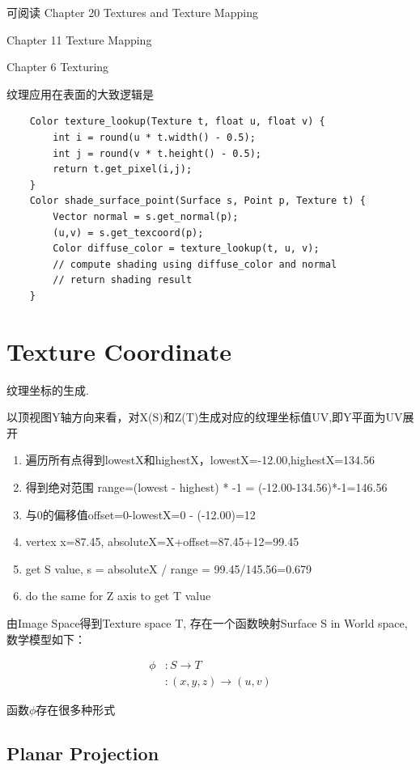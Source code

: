 可阅读
Chapter 20 Textures and Texture Mapping\cite{CGPP3ed}

Chapter 11 Texture Mapping\cite{FCG4ed}

Chapter 6 Texturing\cite{RTR4ed}

纹理应用在表面的大致逻辑是
\begin{lstlisting}
    Color texture_lookup(Texture t, float u, float v) {
        int i = round(u * t.width() - 0.5);
        int j = round(v * t.height() - 0.5);
        return t.get_pixel(i,j);
    }
    Color shade_surface_point(Surface s, Point p, Texture t) {
        Vector normal = s.get_normal(p);
        (u,v) = s.get_texcoord(p);
        Color diffuse_color = texture_lookup(t, u, v);
        // compute shading using diffuse_color and normal 
        // return shading result    
    }
\end{lstlisting}

\section{Texture Coordinate}
 纹理坐标的生成.

以顶视图Y轴方向来看，对X(S)和Z(T)生成对应的纹理坐标值UV,即Y平面为UV展开

\begin{enumerate}
    \item \textsf{遍历所有点得到lowestX和highestX，lowestX=-12.00,highestX=134.56}
    \item \textsf{得到绝对范围 range=(lowest - highest) * -1 = (-12.00-134.56)*-1=146.56}
    \item \textsf{与0的偏移值offset=0-lowestX=0 - (-12.00)=12}
    \item \textsf{vertex x=87.45, absoluteX=X+offset=87.45+12=99.45}
    \item \textsf{get S value, s = absoluteX / range = 99.45/145.56=0.679}
    \item \textsf{do the same for Z axis to get T value}
\end{enumerate}

由Image Space得到Texture space T, 存在一个函数映射Surface S in World space, 数学模型如下：

\begin{align*}
    \phi &: S \rightarrow T \\
    &: (x,y,z) \rightarrow (u,v)
\end{align*}

函数$\phi$存在很多种形式

\subsection{Planar Projection}

